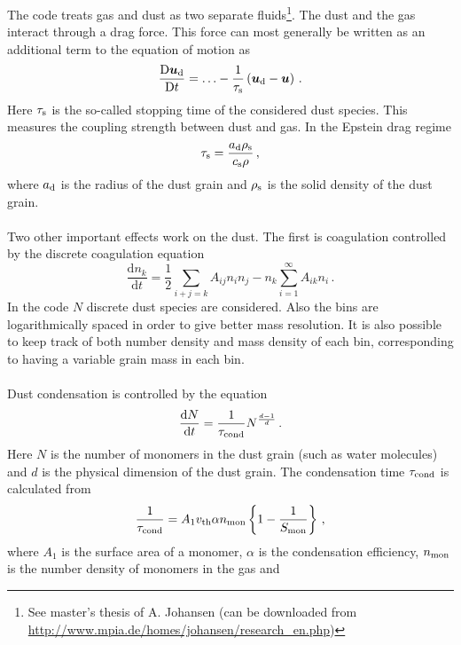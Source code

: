\documentclass[\mydriver,12pt,twoside,notitlepage,a4paper]{article}
\newcommand{\de}      {\mathrm{d}}
\newcommand{\De}      {\mathrm{D}}
\renewcommand{\vec}[1]{{\boldsymbol #1}}
\begin{document}
The code treats gas and dust as two separate fluids\footnote{See master's
thesis of A. Johansen (can be downloaded from\\
\url{http://www.mpia.de/homes/johansen/research_en.php})}. The dust and the gas
interact through a drag force. This force can most generally be written as an
additional term to the equation of motion as
\begin{equation}
  \frac{\De \vec{u}_{\rm d}}{\De t} = \ldots - \frac{1}{\tau_{\rm s}} 
  \left( \vec{u}_{\rm d} - \vec{u} \right)  \, .
\end{equation}
Here $\tau_{\rm s}$ is the so-called stopping time of the considered dust
species. This measures the coupling strength between dust and gas. In the
Epstein drag regime
\begin{equation}
  \tau_{\rm s} = \frac{a_{\rm d} \rho_{\rm s}}{c_{\rm s} \rho} \, ,
\end{equation}
where $a_{\rm d}$ is the radius of the dust grain and $\rho_{\rm s}$ is the
solid density of the dust grain.
\\ \\
Two other important effects work on the dust. The first is coagulation
controlled by the discrete coagulation equation
\begin{equation}
  \frac{\de n_k}{\de t} = \frac{1}{2} \sum_{i+j=k} A_{ij} n_i n_j
  - n_k \sum_{i=1}^\infty A_{ik} n_i \, .
\end{equation}
In the code $N$ discrete dust species are considered. Also the bins are
logarithmically spaced in order to give better mass resolution. It is also
possible to keep track of both number density and mass density of each bin,
corresponding to having a variable grain mass in each bin.
\\ \\
Dust condensation is controlled by the equation
\begin{equation}
  \frac{\de N}{\de t} = \frac{1}{\tau_{\rm cond}} N^{\frac{d-1}{d}} \, .
\end{equation}
Here $N$ is the number of monomers in the dust grain (such as water molecules)
and $d$ is the physical dimension of the dust grain. The condensation time
$\tau_{\rm cond}$ is calculated from
\begin{equation}
  \frac{1}{\tau_{\rm cond}} = A_1 v_{\rm th} \alpha n_{\rm mon}
  \left\{ 1-\frac{1}{S_{\rm mon}} \right\} \, , 
\end{equation}
where $A_1$ is the surface area of a monomer, $\alpha$ is the condensation
efficiency, $n_{\rm mon}$ is the number density of monomers in the gas and
\end{document}
